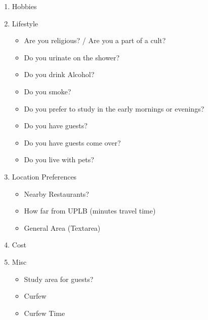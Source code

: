 \documentclass[journal]{IEEEtran}
\begin{document}
\begin{enumerate}
    \item Hobbies
    \item Lifestyle
    \begin{itemize}
        \item Are you religious? / Are you a part of a cult?
        \item Do you urinate on the shower?
        \item Do you drink Alcohol?
        \item Do you smoke?
        \item Do you prefer to study in the early mornings or evenings?
        \item Do you have guests?
        \item Do you have guests come over?
        \item Do you live with pets?
    \end{itemize}

    \item Location Preferences
    \begin{itemize}
        \item Nearby Restaurants?
        \item How far from UPLB (minutes travel time)
        \item General Area (Textarea)
    \end{itemize}

    \item Cost
    \item Misc
    \begin{itemize}
        \item Study area for guests?
        \item Curfew
        \item Curfew Time
    \end{itemize}
\end{enumerate}
\end{document}
